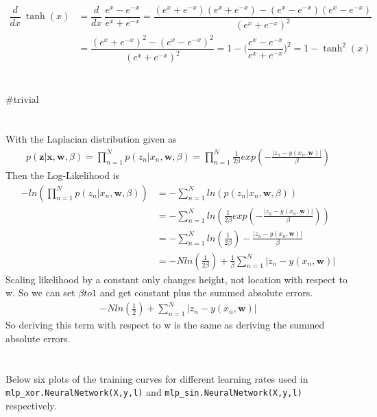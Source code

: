 \documentclass[11pt]{article}
\newcommand{\exercise}{\section{}}
\begin{document}
\begin{align*}
	\dfrac{d}{dx}\ \tanh(x) &= \dfrac{d}{dx}\ \dfrac{e^x - e^{-x}}{e^x + e^{-x}} 
	= \dfrac{(e^x + e^{-x})(e^x + e^{-x}) - (e^x - e^{-x})(e^x - e^{-x})}{(e^x + e^{-x})^2}\\
	&= \dfrac{(e^x + e^{-x})^2 - (e^x - e^{-x})^2}{(e^x + e^{-x})^2} = 1 - \Big(\dfrac{e^x - e^{-x}}{e^x + e^{-x}}\Big)^2 = 1 - \tanh^2(x)
\end{align*}

\exercise
\#trivial

\exercise
With the Laplacian distribution given as
\begin{align}
	p(\textbf{z} | \textbf{x},\textbf{w},\beta) = \prod_{n=1}^N p(z_n | x_n, \textbf{w}, \beta) = \prod_{n=1}^{N}\frac{1}{2\beta}exp(-\frac{|z_n-y(x_n, \textbf{w})|}{\beta})
\end{align}
Then the Log-Likelihood is
\begin{align}
	-ln(\prod_{n=1}^{N} p(z_n | x_n, \textbf{w}, \beta)) &= -\sum_{n=1}^{N} ln(p(z_n | x_n, \textbf{w}, \beta)) \\
	&= -\sum_{n=1}^{N} ln(\frac{1}{2\beta}exp(-\frac{|z_n - y(x_n, \textbf{w})|}{\beta})) \\
	&= -\sum_{n=1}^{N} ln(\frac{1}{2\beta}) - \frac{|z_n - y(x_n, \textbf{w})|}{\beta} \\
	&= -Nln(\frac{1}{2\beta}) + \frac{1}{\beta}\sum_{n=1}^{N}|z_n - y(x_n, \textbf{w})|
\end{align}
Scaling likelihood by a constant only changes height, not location with respect to w. So we can set $\beta to 1$ and get constant plus the summed absolute errors.
\begin{align}
	-Nln(\frac{1}{2}) + \sum_{n=1}^{N}|z_n - y(x_n, \textbf{w})|
\end{align}
So deriving this term with respect to w is the same as deriving the summed absolute errors.

\exercise
Below six plots of the training curves for different learning rates used in \texttt{mlp\_xor.NeuralNetwork(X,y,l)} and \texttt{mlp\_sin.NeuralNetwork(X,y,l)} respectively.
\end{document}
